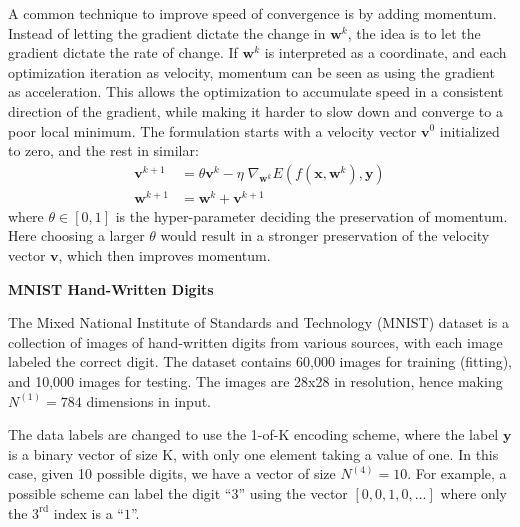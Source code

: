 \documentclass[12pt]{article}
\newcommand{\mb}{\mathbf}
\begin{document}
A common technique to improve speed of convergence 
is by adding momentum.
Instead of letting the gradient dictate the change in $\mb{w}^k$,
the idea is to let the gradient dictate the rate of change.
If $\mb{w}^k$ is interpreted as a coordinate,
and each optimization iteration as velocity,
momentum can be seen as using the gradient as acceleration. 
This allows the optimization to accumulate speed in 
a consistent direction of the gradient, 
while making it harder to slow down and 
converge to a poor local minimum.
The formulation starts with a velocity vector $\mb{v}^0$
initialized to zero, and the rest in similar:
%
\begin{equation}
\begin{aligned}
	\mb{v}^{k+1} &= \theta \mb{v}^{k} - \eta \; \nabla_{\mb{w}^k} 
				E\left(f(\mb{x},\mb{w}^k),\mb{y}\right) \\
	\mb{w}^{k+1} &= \mb{w}^{k} + \mb{v}^{k+1}
\end{aligned}
\end{equation}
%
where $\theta \in [0,1]$ is the hyper-parameter 
deciding the preservation of momentum.
Here choosing a larger $\theta$ would result in a stronger 
preservation of the velocity vector $\mb{v}$,
which then improves momentum.

\pagebreak
\noindent
\large
{\bf MNIST Hand-Written Digits}
\normalsize

The Mixed National Institute of Standards and Technology
(MNIST) dataset is a collection of images of hand-written digits
from various sources,
with each image labeled the correct digit.
The dataset contains 60,000 images for training (fitting),
and 10,000 images for testing.
The images are 28x28 in resolution,
hence making $N^{(1)} = 784$ dimensions in input.

The data labels are changed to use the 1-of-K encoding scheme,
where the label $\mb{y}$ is a binary vector of size K,
with only one element taking a value of one.
In this case, given 10 possible digits,
we have a vector of size $N^{(4)} = 10$.
For example, a possible scheme can label the digit ``$3$'' 
using the vector $[0,0,1,0,\ldots]$ where 
only the $3^\text{rd}$ index is a ``$1$''.
\end{document}
